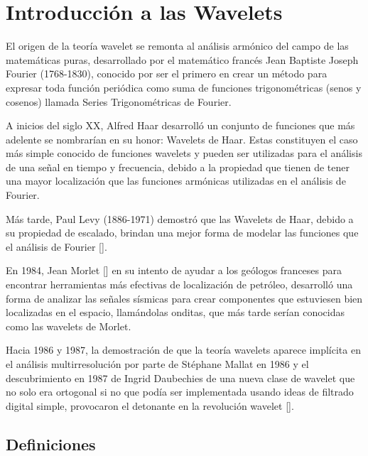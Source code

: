 \section{Introducci\'on a las Wavelets}

\par El origen de la teor\'ia wavelet se remonta al an\'alisis arm\'onico del campo de las matem\'aticas puras, desarrollado por el matem\'atico franc\'es Jean Baptiste Joseph Fourier (1768-1830), conocido por ser el primero en crear un m\'etodo para expresar toda funci\'on peri\'odica como suma de funciones trigonom\'etricas (senos y cosenos) llamada Series Trigonom\'etricas de Fourier.

\par A inicios del siglo XX, Alfred Haar desarroll\'o un conjunto de funciones que m\'as adelente se nombrar\'ian en su honor: Wavelets de Haar. Estas constituyen el caso m\'as simple conocido de funciones wavelets y pueden ser utilizadas para el an\'alisis de una se\~nal en tiempo y frecuencia, debido a la propiedad que tienen de tener una mayor localizaci\'on que las funciones arm\'onicas utilizadas en el an\'alisis de Fourier.

\par M\'as tarde, Paul Levy (1886-1971) demostr\'o que las Wavelets de Haar, debido a su propiedad de escalado, brindan una mejor forma de modelar las funciones que el an\'alisis de Fourier [\textcolor{cyan}{\cite{6}}].

\par En 1984, Jean Morlet [\cite{21}] en su intento de ayudar a los ge\'ologos franceses para encontrar herramientas m\'as efectivas de localizaci\'on de petr\'oleo, desarroll\'o una forma de analizar las se\~nales s\'ismicas para crear componentes que estuviesen bien localizadas en el espacio, llam\'andolas onditas, que m\'as tarde ser\'ian conocidas como las wavelets de Morlet.

\par Hacia 1986 y 1987, la demostraci\'on de que la teor\'ia wavelets aparece impl\'icita en el an\'alisis multirresoluci\'on por parte de Stéphane Mallat en 1986 y el descubrimiento en 1987 de Ingrid Daubechies de una nueva clase de wavelet que no solo era ortogonal si no que pod\'ia ser implementada usando ideas de filtrado digital simple, provocaron el detonante en la revoluci\'on wavelet [\textcolor{cyan}{\cite{7}}].

\subsection{Definiciones}

